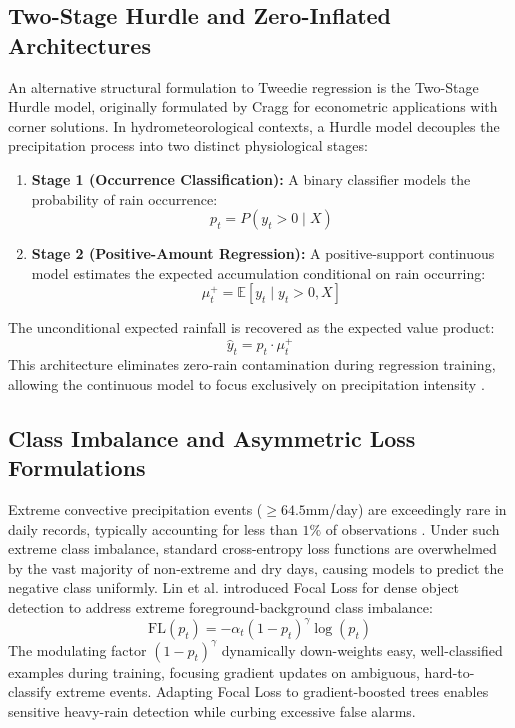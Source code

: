 \documentclass[12pt]{article}
\begin{document}
\subsection{Two-Stage Hurdle and Zero-Inflated Architectures}
An alternative structural formulation to Tweedie regression is the Two-Stage Hurdle model, originally formulated by Cragg \cite{cragg1971} for econometric applications with corner solutions. In hydrometeorological contexts, a Hurdle model decouples the precipitation process into two distinct physiological stages:
\begin{enumerate}
    \item \textbf{Stage 1 (Occurrence Classification):} A binary classifier models the probability of rain occurrence:
    \begin{equation}
    p_t = P(y_t > 0 \mid X)
    \end{equation}
    \item \textbf{Stage 2 (Positive-Amount Regression):} A positive-support continuous model estimates the expected accumulation conditional on rain occurring:
    \begin{equation}
    \mu_t^+ = \mathbb{E}[y_t \mid y_t > 0, X]
    \end{equation}
\end{enumerate}
The unconditional expected rainfall is recovered as the expected value product:
\begin{equation}
\hat{y}_t = p_t \cdot \mu_t^+
\end{equation}
This architecture eliminates zero-rain contamination during regression training, allowing the continuous model to focus exclusively on precipitation intensity \cite{cragg1971, duan1983}.

\subsection{Class Imbalance and Asymmetric Loss Formulations}
Extreme convective precipitation events ($\ge 64.5$\;mm/day) are exceedingly rare in daily records, typically accounting for less than $1\%$ of observations \cite{pai2014}. Under such extreme class imbalance, standard cross-entropy loss functions are overwhelmed by the vast majority of non-extreme and dry days, causing models to predict the negative class uniformly. Lin et al. \cite{lin2017} introduced Focal Loss for dense object detection to address extreme foreground-background class imbalance:
\begin{equation}
\text{FL}(p_t) = -\alpha_t (1 - p_t)^\gamma \log(p_t)
\end{equation}
The modulating factor $(1 - p_t)^\gamma$ dynamically down-weights easy, well-classified examples during training, focusing gradient updates on ambiguous, hard-to-classify extreme events. Adapting Focal Loss to gradient-boosted trees enables sensitive heavy-rain detection while curbing excessive false alarms.
\end{document}

